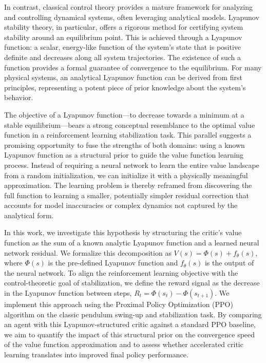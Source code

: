 \documentclass[]{article}
\begin{document}
In contrast, classical control theory provides a mature framework for analyzing and controlling dynamical systems, often leveraging analytical models. Lyapunov stability theory, in particular, offers a rigorous method for certifying system stability around an equilibrium point. This is achieved through a Lyapunov function: a scalar, energy-like function of the system's state that is positive definite and decreases along all system trajectories. The existence of such a function provides a formal guarantee of convergence to the equilibrium. For many physical systems, an analytical Lyapunov function can be derived from first principles, representing a potent piece of prior knowledge about the system's behavior.

The objective of a Lyapunov function—to decrease towards a minimum at a stable equilibrium—bears a strong conceptual resemblance to the optimal value function in a reinforcement learning stabilization task. This parallel suggests a promising opportunity to fuse the strengths of both domains: using a known Lyapunov function as a structural prior to guide the value function learning process. Instead of requiring a neural network to learn the entire value landscape from a random initialization, we can initialize it with a physically meaningful approximation. The learning problem is thereby reframed from discovering the full function to learning a smaller, potentially simpler residual correction that accounts for model inaccuracies or complex dynamics not captured by the analytical form.

In this work, we investigate this hypothesis by structuring the critic's value function as the sum of a known analytic Lyapunov function and a learned neural network residual. We formalize this decomposition as $V(s) = \Phi(s) + f_\theta(s)$, where $\Phi(s)$ is the pre-defined Lyapunov function and $f_\theta(s)$ is the output of the neural network. To align the reinforcement learning objective with the control-theoretic goal of stabilization, we define the reward signal as the decrease in the Lyapunov function between steps, $R_t = \Phi(s_t) - \Phi(s_{t+1})$. We implement this approach using the Proximal Policy Optimization (PPO) algorithm on the classic pendulum swing-up and stabilization task. By comparing an agent with this Lyapunov-structured critic against a standard PPO baseline, we aim to quantify the impact of this structural prior on the convergence speed of the value function approximation and to assess whether accelerated critic learning translates into improved final policy performance.
\end{document}
